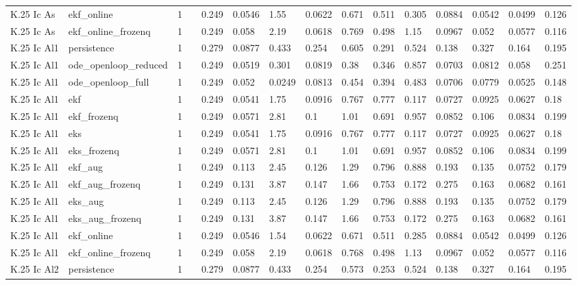 \begin{table}[t]
\begin{tabular}{lllllllllllllll}
K.25 Ic As & ekf\_online & 1 &  & 0.249 & 0.0546 & 1.55 & 0.0622 & 0.671 & 0.511 & 0.305 & 0.0884 & 0.0542 & 0.0499 & 0.126 \\
K.25 Ic As & ekf\_online\_frozenq & 1 &  & 0.249 & 0.058 & 2.19 & 0.0618 & 0.769 & 0.498 & 1.15 & 0.0967 & 0.052 & 0.0577 & 0.116 \\
K.25 Ic Al1 & persistence & 1 &  & 0.279 & 0.0877 & 0.433 & 0.254 & 0.605 & 0.291 & 0.524 & 0.138 & 0.327 & 0.164 & 0.195 \\
K.25 Ic Al1 & ode\_openloop\_reduced & 1 &  & 0.249 & 0.0519 & 0.301 & 0.0819 & 0.38 & 0.346 & 0.857 & 0.0703 & 0.0812 & 0.058 & 0.251 \\
K.25 Ic Al1 & ode\_openloop\_full & 1 &  & 0.249 & 0.052 & 0.0249 & 0.0813 & 0.454 & 0.394 & 0.483 & 0.0706 & 0.0779 & 0.0525 & 0.148 \\
K.25 Ic Al1 & ekf & 1 &  & 0.249 & 0.0541 & 1.75 & 0.0916 & 0.767 & 0.777 & 0.117 & 0.0727 & 0.0925 & 0.0627 & 0.18 \\
K.25 Ic Al1 & ekf\_frozenq & 1 &  & 0.249 & 0.0571 & 2.81 & 0.1 & 1.01 & 0.691 & 0.957 & 0.0852 & 0.106 & 0.0834 & 0.199 \\
K.25 Ic Al1 & eks & 1 &  & 0.249 & 0.0541 & 1.75 & 0.0916 & 0.767 & 0.777 & 0.117 & 0.0727 & 0.0925 & 0.0627 & 0.18 \\
K.25 Ic Al1 & eks\_frozenq & 1 &  & 0.249 & 0.0571 & 2.81 & 0.1 & 1.01 & 0.691 & 0.957 & 0.0852 & 0.106 & 0.0834 & 0.199 \\
K.25 Ic Al1 & ekf\_aug & 1 &  & 0.249 & 0.113 & 2.45 & 0.126 & 1.29 & 0.796 & 0.888 & 0.193 & 0.135 & 0.0752 & 0.179 \\
K.25 Ic Al1 & ekf\_aug\_frozenq & 1 &  & 0.249 & 0.131 & 3.87 & 0.147 & 1.66 & 0.753 & 0.172 & 0.275 & 0.163 & 0.0682 & 0.161 \\
K.25 Ic Al1 & eks\_aug & 1 &  & 0.249 & 0.113 & 2.45 & 0.126 & 1.29 & 0.796 & 0.888 & 0.193 & 0.135 & 0.0752 & 0.179 \\
K.25 Ic Al1 & eks\_aug\_frozenq & 1 &  & 0.249 & 0.131 & 3.87 & 0.147 & 1.66 & 0.753 & 0.172 & 0.275 & 0.163 & 0.0682 & 0.161 \\
K.25 Ic Al1 & ekf\_online & 1 &  & 0.249 & 0.0546 & 1.54 & 0.0622 & 0.671 & 0.511 & 0.285 & 0.0884 & 0.0542 & 0.0499 & 0.126 \\
K.25 Ic Al1 & ekf\_online\_frozenq & 1 &  & 0.249 & 0.058 & 2.19 & 0.0618 & 0.768 & 0.498 & 1.13 & 0.0967 & 0.052 & 0.0577 & 0.116 \\
K.25 Ic Al2 & persistence & 1 &  & 0.279 & 0.0877 & 0.433 & 0.254 & 0.573 & 0.253 & 0.524 & 0.138 & 0.327 & 0.164 & 0.195 \\

\end{tabular}
\end{table}
